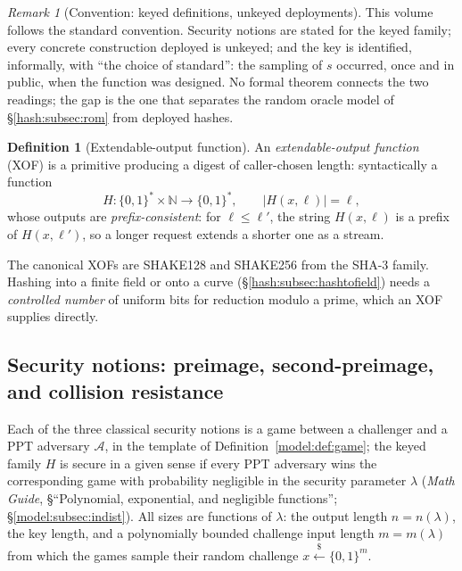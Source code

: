 \documentclass[11pt,a4paper]{article}
\theoremstyle{definition}
\newtheorem{definition}[theorem]{Definition}
\theoremstyle{remark}
\newtheorem{remark}[theorem]{Remark}
\newcommand{\N}{\ensuremath{\mathbb{N}}}
\providecommand{\abs}[1]{\lvert #1 \rvert}
\begin{document}
\begin{remark}[Convention: keyed definitions, unkeyed deployments]
\label{hash:rem:keyed}
This volume follows the standard convention. Security notions are
stated for the keyed family; every concrete construction deployed is
unkeyed; and the key is identified, informally, with ``the choice of
standard'': the sampling of \(s\) occurred, once and in public, when
the function was designed. No formal theorem connects the two
readings; the gap is the one that separates the random oracle model
of \S\ref{hash:subsec:rom} from deployed hashes.
\end{remark}

\begin{definition}[Extendable-output function]\label{hash:def:xof}
An \emph{extendable-output function} (XOF) is a primitive producing a
digest of caller-chosen length: syntactically a function
\[
H \colon \{0,1\}^{*} \times \N \longrightarrow \{0,1\}^{*},
\qquad \abs{H(x, \ell)} = \ell,
\]
whose outputs are \emph{prefix-consistent}: for
\(\ell \le \ell'\), the string \(H(x, \ell)\) is a prefix of
\(H(x, \ell')\), so a longer request extends a shorter one as a
stream.
\end{definition}

The canonical XOFs are SHAKE128 and SHAKE256 from the SHA-3 family.
Hashing into a finite field or onto a curve
(\S\ref{hash:subsec:hashtofield}) needs a \emph{controlled number} of
uniform bits for reduction modulo a prime, which an XOF supplies
directly.

\subsection{Security notions: preimage, second-preimage, and
collision resistance}\label{hash:subsec:games}

Each of the three classical security notions is a game between a
challenger and a PPT adversary \(\mathcal{A}\), in the template of
Definition~\ref{model:def:game}; the keyed family \(H\) is secure in a
given sense if every PPT adversary wins the corresponding game with
probability negligible in the security parameter \(\lambda\)
(\emph{Math Guide}, \S``Polynomial, exponential, and negligible
functions''; \S\ref{model:subsec:indist}). All sizes are functions of
\(\lambda\): the output length \(n = n(\lambda)\), the key length, and
a polynomially bounded challenge input length \(m = m(\lambda)\) from
which the games sample their random challenge
\(x \xleftarrow{\$} \{0,1\}^{m}\).
\end{document}
